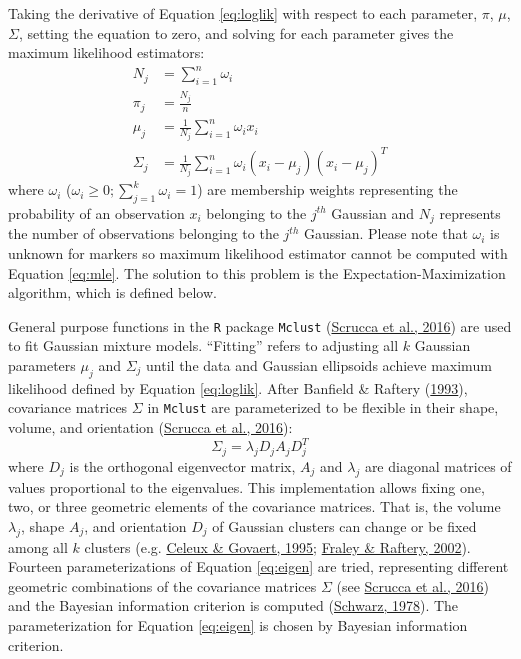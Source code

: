 Taking the derivative of Equation \eqref{eq:loglik} with respect to each parameter, \(\pi\), \(\mu\), \(\Sigma\), setting the equation to zero, and solving for each parameter gives the maximum likelihood estimators:
\begin{equation}
  \begin{aligned}
    N_j &= \sum_{i=1}^n \omega_{i} \\
    \pi_j &= \frac{N_j}{n} \\
    \mu_j &= \frac{1}{N_j} \sum_{i=1}^n \omega_{i} x_i \\
    \Sigma_j &= \frac{1}{N_j} \sum_{i=1}^n \omega_{i} (x_i - \mu_j)(x_i - \mu_j)^T
  \end{aligned}
  \label{eq:mle}
\end{equation}
where \(\omega_{i}\) (\(\omega_{i} \geq 0; \sum_{j=1}^k \omega_{i} = 1\)) are membership weights representing the probability of an observation \(x_i\) belonging to the \(j^{th}\) Gaussian and \(N_j\) represents the number of observations belonging to the \(j^{th}\) Gaussian. Please note that \(\omega_{i}\) is unknown for markers so maximum likelihood estimator cannot be computed with Equation \eqref{eq:mle}. The solution to this problem is the Expectation-Maximization algorithm, which is defined below.

General purpose functions in the \texttt{R} package \texttt{Mclust} (\protect\hyperlink{ref-scrucca2016}{Scrucca et al., 2016}) are used to fit Gaussian mixture models. ``Fitting'' refers to adjusting all \(k\) Gaussian parameters \(\mu_j\) and \(\Sigma_j\) until the data and Gaussian ellipsoids achieve maximum likelihood defined by Equation \eqref{eq:loglik}. After Banfield \& Raftery (\protect\hyperlink{ref-banfield1993}{1993}), covariance matrices \(\Sigma\) in \texttt{Mclust} are parameterized to be flexible in their shape, volume, and orientation (\protect\hyperlink{ref-scrucca2016}{Scrucca et al., 2016}):
\begin{equation}
  \Sigma_j = \lambda_j D_j A_j D_j^T
  \label{eq:eigen}
\end{equation}
where \(D_j\) is the orthogonal eigenvector matrix, \(A_j\) and \(\lambda_j\) are diagonal matrices of values proportional to the eigenvalues. This implementation allows fixing one, two, or three geometric elements of the covariance matrices. That is, the volume \(\lambda_j\), shape \(A_j\), and orientation \(D_j\) of Gaussian clusters can change or be fixed among all \(k\) clusters (e.g. \protect\hyperlink{ref-celeux1995}{Celeux \& Govaert, 1995}; \protect\hyperlink{ref-fraley2002}{Fraley \& Raftery, 2002}). Fourteen parameterizations of Equation \eqref{eq:eigen} are tried, representing different geometric combinations of the covariance matrices \(\Sigma\) (see \protect\hyperlink{ref-scrucca2016}{Scrucca et al., 2016}) and the Bayesian information criterion is computed (\protect\hyperlink{ref-schwarz1978}{Schwarz, 1978}). The parameterization for Equation \eqref{eq:eigen} is chosen by Bayesian information criterion.

